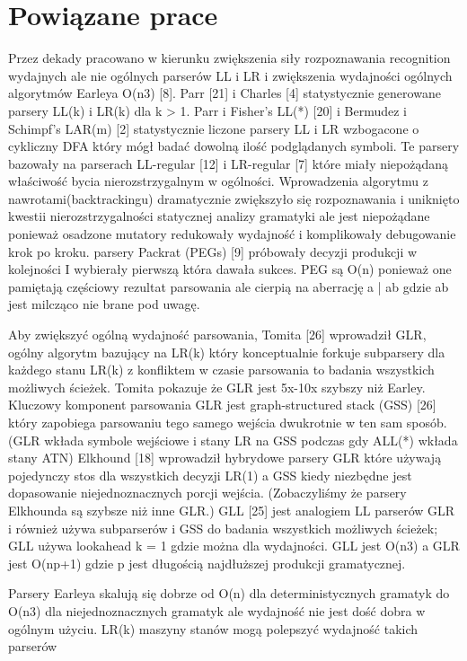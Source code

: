 \section{Powiązane prace}
Przez dekady pracowano w kierunku zwiększenia
siły rozpoznawania recognition wydajnych ale nie ogólnych
parserów LL i LR i zwiększenia wydajności ogólnych algorytmów
Earleya O(n3) [8]. Parr [21] i Charles [4] statystycznie generowane parsery LL(k) i LR(k)
dla k > 1. Parr i Fisher’s LL(*) [20] i Bermudez i Schimpf’s LAR(m) [2]
statystycznie liczone parsery LL i LR wzbogacone o cykliczny
DFA który mógł badać dowolną ilość podglądanych symboli. Te
parsery bazowały na parserach LL-regular [12] i LR-regular [7]
które miały niepożądaną właściwość bycia nierozstrzygalnym w ogólności.
Wprowadzenia algorytmu z nawrotami(backtrackingu) dramatycznie zwiększyło się rozpoznawania
i uniknięto kwestii nierozstrzygalności statycznej analizy gramatyki
ale jest niepożądane ponieważ osadzone mutatory redukowały wydajność
i komplikowały debugowanie krok po kroku. parsery Packrat (PEGs) [9] próbowały decyzji
produkcji w kolejności I wybierały pierwszą która dawała sukces. PEG są
O(n) ponieważ one pamiętają częściowy rezultat parsowania ale cierpią
na aberrację a | ab gdzie ab jest milcząco nie brane pod uwagę.
\par
Aby zwiększyć ogólną wydajność parsowania, Tomita [26] wprowadził GLR, ogólny algorytm
bazujący na LR(k) który konceptualnie forkuje subparsery dla każdego stanu
LR(k) z konfliktem w czasie parsowania to badania wszystkich możliwych ścieżek.
Tomita pokazuje że GLR jest 5x-10x szybszy niż Earley. Kluczowy komponent
parsowania GLR jest graph-structured stack (GSS) [26] który zapobiega parsowaniu
tego samego wejścia dwukrotnie w ten sam sposób.
(GLR wkłada symbole wejściowe i stany LR na GSS podczas gdy ALL(*) wkłada stany ATN)
Elkhound [18] wprowadził hybrydowe parsery GLR które używają pojedynczy stos
dla wszystkich decyzji LR(1) a GSS kiedy niezbędne jest dopasowanie
niejednoznacznych porcji wejścia. (Zobaczyliśmy że parsery Elkhounda
są szybsze niż inne GLR.) GLL [25] jest analogiem LL parserów GLR
i również używa subparserów i GSS do badania wszystkich możliwych ścieżek;
GLL używa lookahead k = 1 gdzie można dla wydajności.
GLL jest O(n3) a GLR jest O(np+1)
gdzie p jest długością najdłuższej produkcji gramatycznej.
\par
Parsery Earleya skalują się dobrze od  O(n) dla deterministycznych gramatyk
do O(n3) dla niejednoznacznych gramatyk ale wydajność
nie jest dość dobra w ogólnym użyciu.
LR(k) maszyny stanów mogą polepszyć wydajność takich parserów
